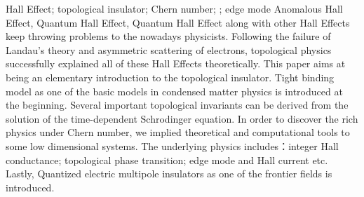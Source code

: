\makecover

\begin{abstract}{霍尔效应; 拓扑绝缘体; Chern number; edge mode}
反常霍尔效应，量子霍尔效应和量子反常霍尔效应等一系列霍尔效应不断地给当代物理学家抛出一个个难题。在简单的朗道能级理论，电子在晶格中特异性散射理论失败的情况下，拓扑物理理论的出现并一举解决了这些问题。本文将会通过对低维模型的分析，对这个新的凝聚态分支做一个介绍。紧束缚模型作为凝聚态的基础被放到前面部分。之后文章会在求解含时薛定谔方程的过程中引入一些拓扑不变量的概念。我们还用了理论推演和数值计算的方法来揭示其中一个拓扑量—Chern number 背后丰富的物理，包括：整数的霍尔电导；拓扑相变；edge mode和霍尔电流等。最后还对拓扑绝缘体的一个前沿方向—高阶拓扑绝缘体做出简要介绍。
\end{abstract}


\begin{abstractEng}{Hall Effect; topological insulator; Chern number; ; edge mode}
Anomalous Hall Effect,  Quantum Hall Effect,  Quantum Hall Effect along with other Hall Effects keep throwing problems to the nowadays physicists. Following the failure of Landau's theory and asymmetric scattering of electrons, topological physics successfully explained all of these Hall Effects theoretically. This paper aims at being an elementary introduction to the topological insulator. Tight binding model as one of the basic models in condensed matter physics is introduced at the beginning. Several important topological invariants can be derived from the solution of the time-dependent Schrodinger equation. In order to discover the rich physics under Chern number, we implied theoretical and computational tools to some low dimensional systems. The underlying physics includes：integer Hall conductance; topological phase transition; edge mode and Hall current etc. Lastly, Quantized electric multipole insulators as one of the frontier fields is introduced.
\end{abstractEng}


\tableofcontents
